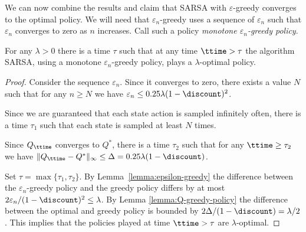 We can now combine the results and claim that SARSA with
$\varepsilon$-greedy converges to the optimal policy. We will need
that $\varepsilon_n$-greedy uses a sequence of $\varepsilon_n$ such
that $\varepsilon_n$ converges to zero as $n$ increases. Call such a
policy \emph{monotone $\varepsilon_n$-greedy policy}.

\begin{theorem}
For any $\lambda>0$ there is a time $\tau$ such that at any time
$\ttime>\tau$ the algorithm SARSA, using a monotone
$\varepsilon_n$-greedy policy, plays a $\lambda$-optimal policy.
\end{theorem}

\begin{proof}
Consider the sequence $\varepsilon_n$. Since it converges to zero, there exists a value $N$ such that for any $n\geq N$ we have $\varepsilon_n\leq 0.25\lambda(1-\discount)^2$.

Since we are guaranteed that each state action is sampled infinitely
often, there is a time $\tau_1$ such that each state is sampled at
least $N$ times.

Since $Q_\ttime$ converges to $Q^*$, there is a time $\tau_2$ such that for any $\ttime\geq \tau_2$ we have $\|Q_\ttime-Q^*\|_\infty \leq \Delta=0.25\lambda (1-\discount)$.

Set $\tau=\max\{\tau_1,\tau_2\}$. By
Lemma~\ref{lemma:epsilon-greedy} the difference between the
$\varepsilon_n$-greedy policy and the greedy policy differs by at most $2\varepsilon_n/(1-\discount)^2\leq \lambda$. By Lemma
\ref{lemma:Q-greedy-policy} the difference between the optimal and
greedy policy is bounded by $2\Delta/(1-\discount)=\lambda/2$. This
implies that the policies played at time $\ttime>\tau$ are
$\lambda$-optimal.
\end{proof}




